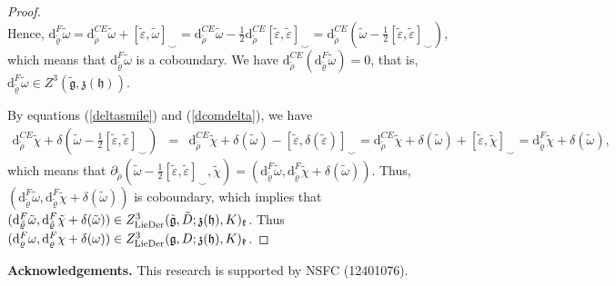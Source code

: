 \documentclass[12pt]{amsart}
\newcommand{\g}{\mathfrak g}
\newcommand{\h}{\mathfrak h}
\newcommand{\frkk}{\mathfrak k}
\newcommand{\frkz}{\mathfrak z}
\newcommand{\dM}{\mathrm{d}}
\newcommand{\LD}{{\rm LieDer }}
\begin{document}
\begin{proof}
\begin{equation*}
    \end{equation*}
    Hence, $\dM^{F}_{\tilde{\varrho}}\tilde{\omega}=\dM^{CE}_{\tilde{\rho}}\tilde{\omega}+[\tilde{\varepsilon},\tilde{\omega}]_{\smile}=\dM^{CE}_{\tilde{\rho}}\tilde{\omega}-\frac{1}{2}\dM^{CE}_{\tilde{\rho}}[\tilde{\varepsilon},\tilde{\varepsilon}]_{\smile}=\dM^{CE}_{\tilde{\rho}}(\tilde{\omega}-\frac{1}{2}[\tilde{\varepsilon},\tilde{\varepsilon}]_{\smile})$, which means that $\dM^{F}_{\tilde{\varrho}}\tilde{\omega}$ is a coboundary. We have $\dM^{CE}_{\tilde{\rho}}(\dM^{F}_{\tilde{\varrho}}\tilde{\omega})=0$, that is, $\dM^{F}_{\tilde{\varrho}}\tilde{\omega}\in Z^3(\tilde{\g},\frkz(\h))$.
   
    By equations (\ref{deltasmile}) and (\ref{dcomdelta}), we have
    \begin{eqnarray*}
        \dM^{CE}_{\tilde{\rho}}\tilde{\chi}+\delta(\tilde{\omega}-\frac{1}{2}[\tilde{\varepsilon}, \tilde{\varepsilon}]_{\smile})&=&\dM^{CE}_{\tilde{\rho}}\tilde{\chi}+\delta(\tilde{\omega})-[\tilde{\varepsilon}, \delta(\tilde{\varepsilon})]_{\smile}=\dM^{CE}_{\tilde{\rho}}\tilde{\chi}+\delta(\tilde{\omega})+[\tilde{\varepsilon}, \tilde{\chi}]_{\smile}=\dM^{F}_{\tilde{\varrho}}\tilde{\chi}+\delta(\tilde{\omega}),
    \end{eqnarray*}
    which means that $\partial_{\tilde{\rho}}(\tilde{\omega}-\frac{1}{2}[\tilde{\varepsilon}, \tilde{\varepsilon}]_{\smile}, \tilde{\chi})=(\dM^{F}_{\tilde{\varrho}}\tilde{\omega}, \dM^{F}_{\tilde{\varrho}}\tilde{\chi}+\delta(\tilde{\omega}))$. Thus, $(\dM^{F}_{\tilde{\varrho}}\tilde{\omega}, \dM^{F}_{\tilde{\varrho}}\tilde{\chi}+\delta(\tilde{\omega}))$ is coboundary, which implies that $(\dM^{F}_{\tilde{\varrho}}\tilde{\omega}, \dM^{F}_{\tilde{\varrho}}\tilde{\chi}+\delta(\tilde{\omega}))\in Z^3_{\LD}(\tilde{\g},\tilde{D};\frkz(\h),K)_\frkk$. Thus $(\dM^F_{\varrho}\omega,\dM^F_{\varrho}\chi+\delta(\omega))\in Z^3_{\LD}(\g,D;\frkz(\h),K)_{\frkk}$.
\end{proof}










\vspace{2mm}
\noindent
{\bf Acknowledgements. } This research is supported by NSFC (12401076).



%
%
\end{document}
